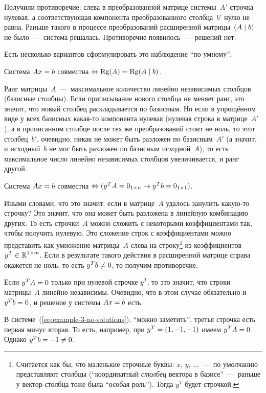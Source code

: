 \documentclass[a4paper,12pt]{article}
\begin{document}
  Получили противоречие: слева в преобразованной матрице системы~$A'$ строчка нулевая, а соответствующая компонента преобразованного столбца~$b'$ нулю не равна.
  Раньше такого в процессе преобразований расширенной матрицы~$(A \hm\mid b)$ не было~---~система решалась.
  Противоречие появилось~---~решений нет.

  Есть несколько вариантов сформулировать это наблюдение ``по-умному''.

  \begin{theorem}
    Система $Ax \hm= b$ совместна $\Leftrightarrow \Rg(A) \hm= \Rg(A \hm\mid b)$.
  \end{theorem}

  Ранг матрицы~$A$~---~максимальное количество линейно независимых столбцов (базисные столбцы).
  Если приписывание нового столбца не меняет ранг, это значит, что новый столбец раскладывается по базисным.
  Но если в упрощённом виде у всех базисных какая-то компонента нулевая (нулевая строка в матрице~$A'$), а в приписанном столбце после тех же преобразований стоит не ноль, то этот столбец~$b'$, очевидно, никак не может быть разложен по базисным~$A'$ (а значит, и исходный~$b$ не мог быть разложен по базисным исходной~$A$), то есть максимальное число линейно независимых столбцов увеличивается, и ранг другой.

  \begin{theorem}[Фредгольма]
    Система $Ax \hm= b$ совместна $\Leftrightarrow (y^T A \hm=0_{1\times n} \hm\rightarrow y^T b \hm= 0_{1\times 1})$.
  \end{theorem}

  Иными словами, что это значит, если в матрице~$A$ удалось занулить какую-то строчку?
  Это значит, что она может быть разложена в линейную комбинацию других.
  То есть строчки~$A$ можно сложить с некоторыми коэффициентами так, чтобы получить нулевую.
  Это сложение строк с коэффициентами можно представить как умножение матрицы~$A$ слева на строку\footnote{Считается как бы, что маленькие строчные буквы: $x$, $y$, ...~---~по умолчанию представляют столбцы (``координатный \emph{столбец} вектора в базисе''~---~раньше у вектор-столбца тоже была ``особая роль''). Тогда $y^T$ будет строчкой.} из коэффициентов $y^T \hm\in \RR^{1\times m}$.
  Если в результате такого действия в расширенной матрице справа окажется не ноль, то есть $y^T b \hm{\not=} 0$, то получим противоречие.

  \begin{example}
    Если $y^T A \hm= 0$ только при нулевой строчке $y^T$, то это значит, что строки матрицы~$A$ линейно независимы.
    Очевидно, что в этом случае обязательно и $y^T b \hm= 0$, и решение у системы $Ax \hm= b$ есть.

    В системе~(\ref{eq:example-3-no-solutions}), ``можно заметить'', третья строчка есть первая минус вторая.
    То есть, например, при $y^T \hm= (1, -1, -1)$ имеем $y^T A \hm= 0$.
    Однако $y^T b \hm= -1 \hm{\not=} 0$.
  \end{example}
  
\end{document}

